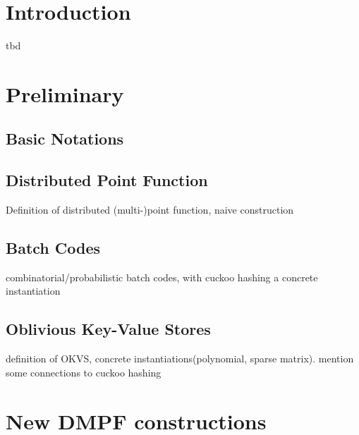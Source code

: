 \documentclass[sigconf]{acmart}
\begin{document}
\section{Introduction}
tbd

\section{Preliminary}
\subsection{Basic Notations}

\subsection{Distributed Point Function}
Definition of distributed (multi-)point function, naive construction
\subsection{Batch Codes}
combinatorial/probabilistic batch codes, with cuckoo hashing a concrete instantiation
\subsection{Oblivious Key-Value Stores}
definition of OKVS, concrete instantiations(polynomial, sparse matrix). mention some connections to cuckoo hashing
\section{New DMPF constructions}
\end{document}
